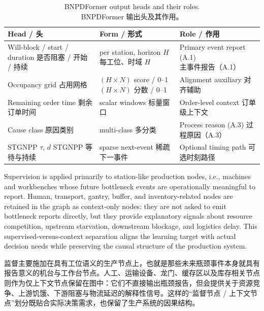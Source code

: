 \documentclass[12pt,a4paper,oneside,scheme=plain]{ctexrep}
\newcommand{\bip}[2]{%
  \par #1\par
  \nobreak\vspace{0.12em}%
  {\small\color{black!62}#2}\par
  \vspace{0.62em}%
}
\begin{document}
\begin{table}[ht]
\centering
\caption{BNPDFormer output heads and their roles.\\
{\small BNPDFormer 输出头及其作用。}}
\label{tab:heads}
\begin{tabular}{p{}p{}p{}}
\toprule
Head / 头 & Form / 形式 & Role / 作用 \\
\midrule
Will-block / start / duration\newline
{\small 是否阻塞 / 开始 / 持续} &
per station, horizon $H$\newline
{\small 每工位、时域 $H$} &
Primary event report (A.1)\newline
{\small 主事件报告（A.1）} \\
Occupancy grid\newline
{\small 占用网格} &
$(H\times N)$ score / 0--1\newline
{\small $(H\times N)$ 分数 / 0--1} &
Alignment auxiliary\newline
{\small 对齐辅助} \\
Remaining order time\newline
{\small 剩余订单时间} &
scalar windows\newline
{\small 标量窗口} &
Order-level context\newline
{\small 订单级上下文} \\
Cause class\newline
{\small 原因类别} &
multi-class\newline
{\small 多分类} &
Process reason (A.3)\newline
{\small 过程原因（A.3）} \\
STGNPP $\tau$, $d$\newline
{\small STGNPP 等待与持续} &
sparse next-event\newline
{\small 稀疏下一事件} &
Optional timing path\newline
{\small 可选时刻路径} \\
\bottomrule
\end{tabular}
\end{table}


\bip
{Supervision is applied primarily to station-like production nodes, i.e., machines and workbenches whose future bottleneck events are operationally meaningful to report. Human, transport, gantry, buffer, and inventory-related nodes are retained in the graph as context-only nodes: they are not asked to emit bottleneck reports directly, but they provide explanatory signals about resource competition, upstream starvation, downstream blockage, and logistics delay. This supervised-versus-context separation aligns the learning target with actual decision needs while preserving the causal structure of the production system.}
{监督主要施加在具有工位语义的生产节点上，也就是那些未来瓶颈事件本身就具有报告意义的机台与工作台节点。人工、运输设备、龙门、缓存区以及库存相关节点则作为仅上下文节点保留在图中：它们不直接输出瓶颈报告，但会提供关于资源竞争、上游饥饿、下游阻塞与物流延迟的解释性信号。这样的“监督节点 / 上下文节点”划分既贴合实际决策需求，也保留了生产系统的因果结构。}
\end{document}

